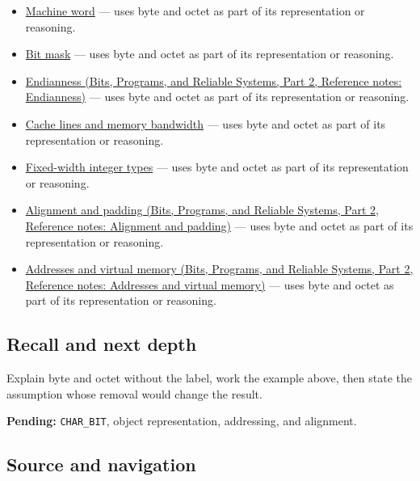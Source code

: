 \hypertarget{appendix-5bee2df85484-used-by}{}

\begin{itemize}
\tightlist
\item
  \hyperref[appendix-d67a19507dc5]{Machine word} --- uses byte and octet as part of its representation or reasoning.
\item
  \hyperref[appendix-dbe5905163c2]{Bit mask} --- uses byte and octet as part of its representation or reasoning.
\item
  \href{../01-Bits-Programs-and-Reliable-Systems-P02/main.pdf\#nameddest=appendix-bc07c3d25b18}{Endianness (Bits, Programs, and Reliable Systems, Part 2, Reference notes: Endianness)} --- uses byte and octet as part of its representation or reasoning.
\item
  \hyperref[appendix-e4ccdbab8320]{Cache lines and memory bandwidth} --- uses byte and octet as part of its representation or reasoning.
\item
  \hyperref[appendix-cc04044b5782]{Fixed-width integer types} --- uses byte and octet as part of its representation or reasoning.
\item
  \href{../01-Bits-Programs-and-Reliable-Systems-P02/main.pdf\#nameddest=appendix-a1f7c53b4742}{Alignment and padding (Bits, Programs, and Reliable Systems, Part 2, Reference notes: Alignment and padding)} --- uses byte and octet as part of its representation or reasoning.
\item
  \href{../01-Bits-Programs-and-Reliable-Systems-P02/main.pdf\#nameddest=appendix-18ee4f913c3c}{Addresses and virtual memory (Bits, Programs, and Reliable Systems, Part 2, Reference notes: Addresses and virtual memory)} --- uses byte and octet as part of its representation or reasoning.
\end{itemize}

\subsection{Recall and next depth}\label{appendix-5bee2df85484-recall-and-next-depth}

\hypertarget{appendix-5bee2df85484-recall-and-next-depth}{}

Explain byte and octet without the label, work the example above, then state the assumption whose removal would change the result.

\textbf{Pending:} \texttt{CHAR\_BIT}, object representation, addressing, and alignment.

\subsection{Source and navigation}\label{appendix-5bee2df85484-source-and-navigation}


